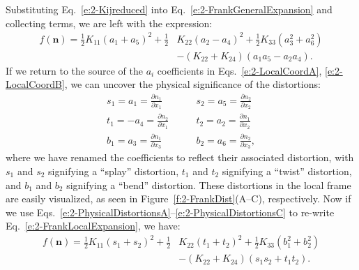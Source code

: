 Substituting Eq.~\ref{e:2-Kijreduced} into Eq.~\ref{e:2-FrankGeneralExpansion} and collecting terms, we are left with the expression:
\begin{align}
  f(\mathbf{n}) = \frac{1}{2}K_{11} (a_1 + a_5)^2 + \frac{1}{2}&K_{22} (a_2 - a_4)^2 + \frac{1}{2}K_{33} (a_3^2 + a_6^2) \nonumber \\
    &- (K_{22} + K_{24}) (a_1 a_5 - a_2 a_4).\label{e:2-FrankLocalExpansion}
\end{align}
If we return to the source of the $a_i$ coefficients in Eqs.~\ref{e:2-LocalCoordA}, \ref{e:2-LocalCoordB}, we can uncover the physical significance of the distortions:
\begin{align}
  s_1 = a_1 = \frac{\partial n_1}{\partial x_1} \quad & \quad s_2 = a_5 = \frac{\partial n_2}{\partial x_2}\label{e:2-PhysicalDistortionsA} \\
  t_1 = - a_4 = \frac{\partial n_2}{\partial x_1} \quad & \quad t_2 = a_2 = \frac{\partial n_1}{\partial x_2}\label{e:2-PhysicalDistortionsB} \\
  b_1 =  a_3 = \frac{\partial n_1}{\partial x_3} \quad & \quad b_2 = a_6 = \frac{\partial n_2}{\partial x_3},\label{e:2-PhysicalDistortionsC}
\end{align}
where we have renamed the coefficients to reflect their associated distortion, with $s_1$ and $s_2$ signifying a ``splay'' distortion, $t_1$ and $t_2$ signifying a ``twist'' distortion, and $b_1$ and $b_2$ signifying a ``bend'' distortion.
These distortions in the local frame are easily visualized, as seen in Figure~\ref{f:2-FrankDist}(A--C), respectively.
Now if we use Eqs.~\ref{e:2-PhysicalDistortionsA}--\ref{e:2-PhysicalDistortionsC} to re-write Eq.~\ref{e:2-FrankLocalExpansion}, we have:
\begin{align}
  f(\mathbf{n}) = \frac{1}{2}K_{11} (s_1 + s_2)^2 + \frac{1}{2}&K_{22} (t_1 + t_2)^2 + \frac{1}{2}K_{33} (b_1^2 + b_2^2) \nonumber \\
    & - (K_{22} + K_{24}) (s_1 s_2 + t_1 t_2).\label{e:2-FrankPhysicalExpansion}
\end{align}

